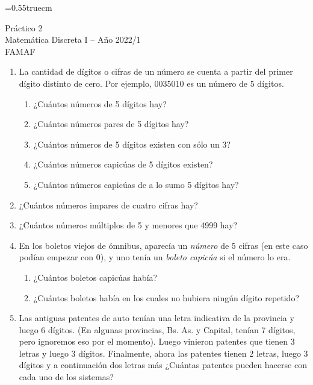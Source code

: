 \documentclass[a4paper,12pt,twoside,spanish,reqno]{amsbook}
\numberwithin{equation}{section}
\begin{document}
    \baselineskip=0.55truecm %
    


{\bf \begin{center} \large  Práctico 2 \\ Matemática Discreta I -- Año 2022/1 \\ FAMAF \end{center}}


\begin {enumerate}
\setlength\itemsep{1.1em}

\item La cantidad de dígitos o cifras de un número se cuenta a partir del primer dígito distinto de cero. Por ejemplo, $0035010$ es un número de $5$ dígitos.
    \begin{enumerate}
        \item ¿Cuántos números de 5 dígitos hay?
        \item ¿Cuántos números pares de 5 dígitos  hay?
        \item ¿Cuántos números de 5 dígitos existen con sólo un 3?
        \item ¿Cuántos números capicúas de 5 dígitos existen?
        \item ¿Cuántos números capicúas de a lo sumo 5 dígitos hay?
    \end{enumerate}


\item ¿Cuántos números impares de cuatro cifras hay?


\item ¿Cuántos números múltiplos de  5 y menores que 4999 hay?


\item En los boletos viejos de ómnibus, aparecía un {\em número} de 5 cifras (en este caso podían empezar con 0), y uno tenía un {\it boleto capicúa} si el número lo era.
    \begin{enumerate}
        \item ¿Cuántos boletos capicúas había?
        \item ¿Cuántos boletos había en los cuales no hubiera ningún dígito repetido?
    \end{enumerate}


\item Las antiguas patentes de auto tenían una letra indicativa de la provincia y luego 6 dígitos. (En algunas provincias, Bs. As. y Capital, tenían 7 dígitos, pero ignoremos eso por el momento). Luego  vinieron patentes que tienen 3 letras y luego 3 dígitos. Finalmente, ahora las patentes tienen 2 letras, luego 3 dígitos y a continuación dos letras más ¿Cuántas patentes pueden hacerse con cada uno de los sistemas?



\end{enumerate}
\end{document}
